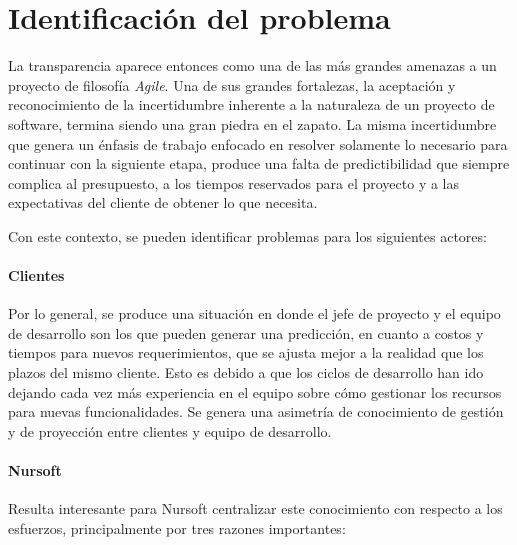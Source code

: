 \section{Identificación del problema}

La transparencia aparece entonces como una de las más grandes amenazas a un
proyecto de filosofía \textit{Agile}. Una de sus grandes fortalezas, la aceptación y
reconocimiento de la incertidumbre inherente a la naturaleza de un proyecto de 
software, termina siendo una gran piedra en el zapato. La misma incertidumbre que
genera un énfasis de trabajo enfocado en resolver solamente lo necesario para
continuar con la siguiente etapa, produce una falta de predictibilidad que siempre
complica al presupuesto, a los tiempos reservados para el proyecto y a las
expectativas del cliente de obtener lo que necesita.

Con este contexto, se pueden identificar problemas para los siguientes actores:

\paragraph{Clientes}

Por lo general, se produce una situación en donde el jefe de proyecto y el equipo
de desarrollo son los que pueden generar una predicción, en cuanto a costos y tiempos
para nuevos requerimientos, que se ajusta mejor a la realidad que los plazos del
mismo cliente. Esto es debido a que los ciclos de desarrollo han ido dejando cada
vez más experiencia en el equipo sobre cómo gestionar los recursos para nuevas
funcionalidades. Se genera una asimetría de conocimiento de gestión y de proyección entre clientes y
equipo de desarrollo. 

\paragraph{Nursoft}

Resulta interesante para Nursoft centralizar este conocimiento con respecto a
los esfuerzos, principalmente por tres razones importantes:

